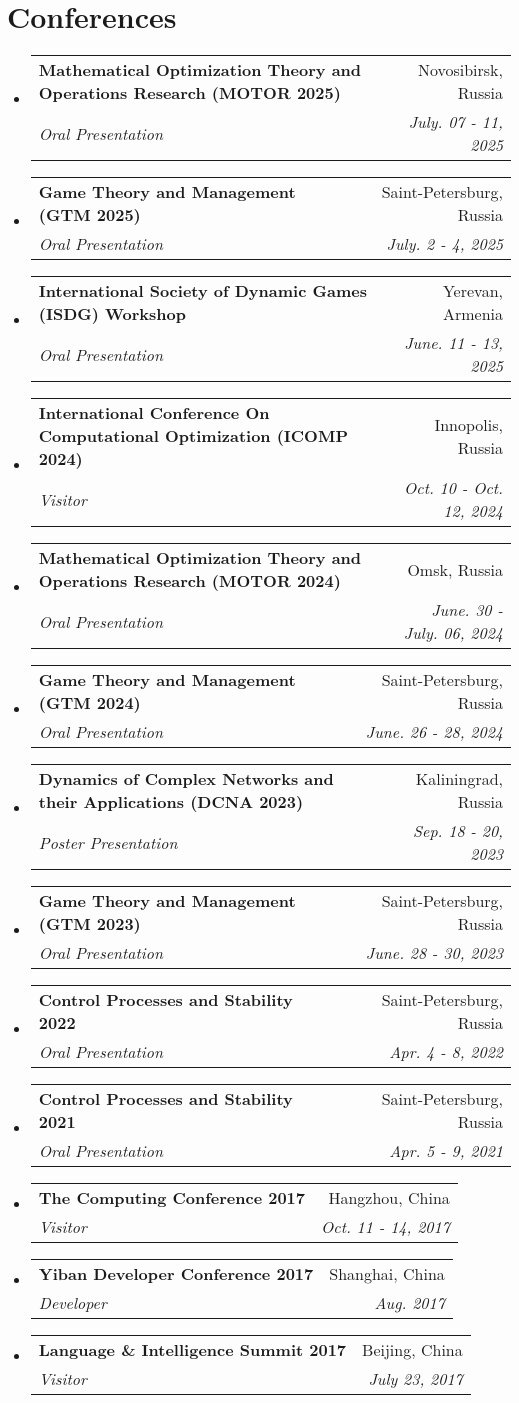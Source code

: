 \documentclass[letterpaper,10pt]{article}
\makeatletter
\newcommand{\resumeSubheading}[4]{
  \vspace{-2pt}\item
  \begin{tabular*}{0.97\textwidth}[t]{l@{\extracolsep{\fill}}r}
    \textbf{#1} & #2 \\
    \textit{\small#3} & \textit{\small #4} \\
  \end{tabular*}\vspace{-7pt}
}
\newenvironment{resumeSubHeadingList}{\begin{itemize}[leftmargin=0.15in, label={}]}{\end{itemize}}
\makeatother
\begin{document}
\section{Conferences}
\begin{resumeSubHeadingList}
  \resumeSubheading{Mathematical Optimization Theory and Operations Research
                    (MOTOR 2025)}{Novosibirsk, Russia}{Oral Presentation}{July.
                    07 - 11, 2025}
  \resumeSubheading{Game Theory and Management (GTM 2025)}{Saint-Petersburg,
                    Russia}{Oral Presentation}{July. 2 - 4, 2025}
  \resumeSubheading{\nth{14} International Society of Dynamic Games (ISDG) Workshop}{Yerevan, Armenia}{Oral Presentation}{June. 11 - 13, 2025}
  \resumeSubheading{International Conference On Computational Optimization
                    (ICOMP 2024)}{Innopolis, Russia}{Visitor}{Oct. 10 - Oct.
                    12, 2024}
  \resumeSubheading{Mathematical Optimization Theory and Operations Research
                    (MOTOR 2024)}{Omsk, Russia}{Oral Presentation}{June. 30 -
                    July. 06, 2024}
  \resumeSubheading{Game Theory and Management (GTM 2024)}{Saint-Petersburg,
                    Russia}{Oral Presentation}{June. 26 - 28, 2024}
  \resumeSubheading{Dynamics of Complex Networks and their Applications (DCNA
                    2023)}{Kaliningrad, Russia}{Poster Presentation}{Sep. 18 -
                    20, 2023}
  \resumeSubheading{Game Theory and Management (GTM 2023)}{Saint-Petersburg,
                    Russia}{Oral Presentation}{June. 28 - 30, 2023}
  \resumeSubheading{Control Processes and Stability 2022}{Saint-Petersburg,
                    Russia}{Oral Presentation}{Apr. 4 - 8, 2022}
  \resumeSubheading{Control Processes and Stability 2021}{Saint-Petersburg,
                    Russia}{Oral Presentation}{Apr. 5 - 9, 2021}
  \resumeSubheading{The Computing Conference 2017}{Hangzhou,
                    China}{Visitor}{Oct. 11 - 14, 2017}
  \resumeSubheading{Yiban Developer Conference 2017}{Shanghai,
                    China}{Developer}{Aug. 2017}
  \resumeSubheading{Language \& Intelligence Summit 2017}{Beijing,
                    China}{Visitor}{July 23, 2017}
\end{resumeSubHeadingList}
\end{document}
